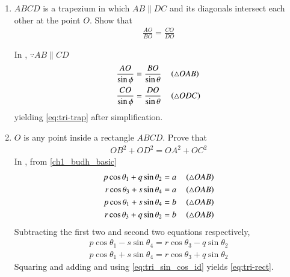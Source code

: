 \begin{enumerate}[label=\thesubsection.\arabic*.,ref=\thesubsection.\theenumi]
\item $ABCD$ is a trapezium in which $AB  \parallel  DC$ and its diagonals intersect each other at the point $O$. Show
that
\begin{align}
	\label{eq:tri-trap}	
\frac{AO}{ BO}=\frac{CO}{  DO}
\end{align}
\begin{figure}[H]
	\begin{center}
			\resizebox{0.6\columnwidth}{!}{}
	\end{center}
	\caption{}
	\label{fig:tri-trap}	
\end{figure}
\solution 
	In , $\because AB \parallel CD$	
\begin{align}
	\frac{AO}{\sin \phi} &= \frac{BO}{\sin \theta} \quad \left(\triangle OAB\right)
	\\
	\frac{CO}{\sin \phi} &= \frac{DO}{\sin \theta} \quad \left(\triangle ODC\right)
\end{align}
yielding
	\eqref{eq:tri-trap}	
	after simplification.
\item $O$ is any point inside a rectangle $ABCD$. Prove that 
\begin{align}
	OB^2+OD^2 = OA^2+OC^2
	\label{eq:tri-rect}	
\end{align}
	\solution
	In 
	,	
from \eqref{ch1_budh_basic}
\begin{align}
	p \cos \theta_1+q \sin \theta_2 = a \quad \left(\triangle OAB\right)
	\\
	r \cos \theta_3+s \sin \theta_4 = a \quad \left(\triangle OAB\right)
	\\
	p \cos \theta_1+s \sin \theta_4 = b \quad \left(\triangle OAB\right)
	\\
	r \cos \theta_3+q \sin \theta_2 = b \quad \left(\triangle OAB\right)
\end{align}
Subtracting the first two and second two equations respectively,
\begin{align}
	p \cos \theta_1 
	-s \sin \theta_4  
= r \cos \theta_3-q \sin \theta_2
\\
	p \cos \theta_1+s \sin \theta_4 = 
	r \cos \theta_3+q \sin \theta_2  
\end{align}
Squaring and adding and using 
\eqref{eq:tri_sin_cos_id}
yields
	\eqref{eq:tri-rect}.	
\begin{figure}[H]
	\begin{center}
			\resizebox{0.6\columnwidth}{!}{}
	\end{center}
	\caption{}
	\label{fig:tri-rect}	
\end{figure}

\end{enumerate}
